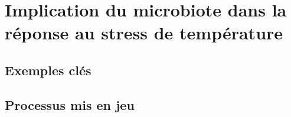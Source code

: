 \chapter{Implication du microbiote dans la réponse au stress de température} %
\label{sec:implicationµbiote}
	
	\section{Exemples clés} %
	\label{sec:exemples}
		

	\section{Processus mis en jeu} %
	\label{sec:process}
		

